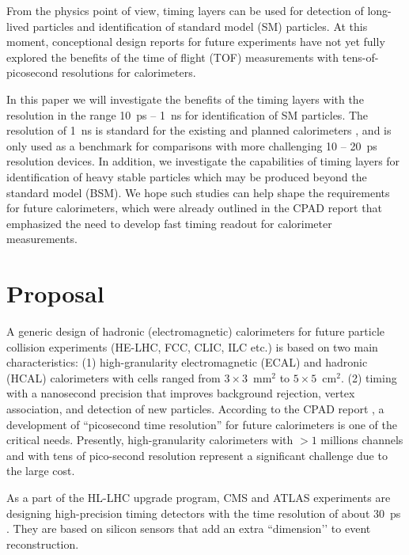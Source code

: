\documentclass[final,1p,11pt]{elsarticle}
\begin{document}
From the physics point of view, timing layers can be used for detection of long-lived particles and identification 
of standard model (SM) particles. 
At this moment, conceptional design reports for future experiments have not yet fully explored 
the benefits of the time of flight (TOF) measurements with tens-of-picosecond resolutions for calorimeters.

In this paper we will investigate the benefits of the timing layers with the resolution in the range
10~ps -- 1~ns for identification of SM particles. 
The resolution of 1~ns is standard for the existing and planned calorimeters \cite{Linssen:1425915,Behnke:2013xla,Benedikt:2206376,Tang:2015qga}, 
and is only used as a benchmark for comparisons with more challenging  
10 -- 20~ps  resolution devices. 
In addition, we investigate the capabilities of timing layers for identification of heavy stable particles which may be produced beyond the 
standard model (BSM). We hope such studies can help shape the requirements for future calorimeters, which were already
outlined in the CPAD report \cite{Ahmed:2019sim} that emphasized the need to develop fast timing readout for calorimeter measurements.
  
\section{Proposal}


A generic design of hadronic (electromagnetic) calorimeters for future particle collision experiments (HE-LHC, FCC, CLIC, ILC etc.) 
is based on two main characteristics: (1) high-granularity  electromagnetic (ECAL) and hadronic (HCAL) 
calorimeters with cells ranged from $3\times 3$~mm$^2$ to $5\times 5$~cm$^2$.
(2) timing with a nanosecond precision that improves background rejection, vertex association, and detection of new particles. 
According to the CPAD report \cite{Ahmed:2019sim}, a development of ``picosecond time resolution'' for future calorimeters is one of the critical needs. 
Presently,  high-granularity calorimeters with $>1$ millions channels and with tens of pico-second resolution represent a 
significant challenge due to the large cost.

As a part of the HL-LHC upgrade program, CMS and ATLAS experiments are designing high-precision timing detectors with the time resolution of about 30~ps \cite{Collaboration:2623663,FERRI2020162159}. They are based on silicon sensors that add an extra ``dimension’’ to event reconstruction. 
\end{document}
